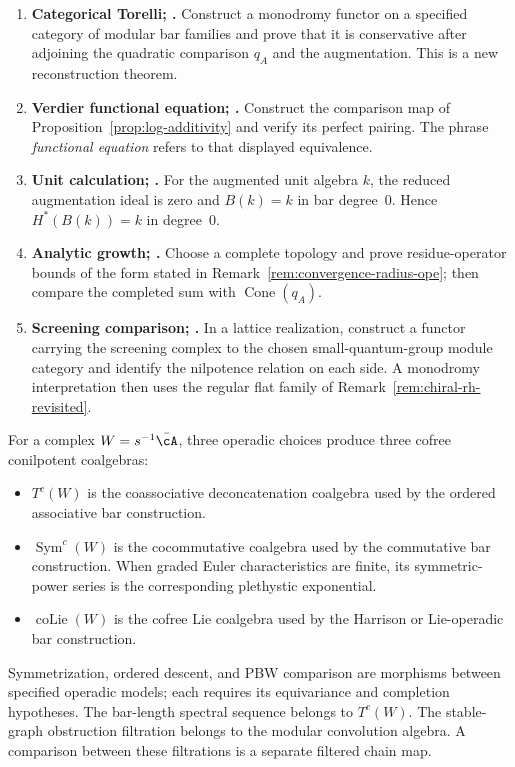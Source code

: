 \begin{enumerate}[label=(\arabic*)]
\item \textbf{Categorical Torelli; \ClaimStatusConjectured.}
Construct a monodromy functor on a specified category of modular bar
families and prove that it is conservative after adjoining the
quadratic comparison $q_A$ and the augmentation.  This is a new
reconstruction theorem.

\item \textbf{Verdier functional equation;
\ClaimStatusConditional.} Construct the comparison map of
Proposition~\ref{prop:log-additivity} and verify its perfect pairing.
The phrase \emph{functional equation} refers to that displayed
equivalence.

\item \textbf{Unit calculation; \ClaimStatusProvedHere.}  For the
augmented unit algebra $k$, the reduced augmentation ideal is zero and
$B(k)=k$ in bar degree~$0$.  Hence
$H^*(B(k))=k$ in degree~$0$.

\item \textbf{Analytic growth; \ClaimStatusHeuristic.}  Choose a
complete topology and prove residue-operator bounds of the form stated
in Remark~\ref{rem:convergence-radius-ope}; then compare the completed
sum with $\operatorname{Cone}(q_A)$.

\item \textbf{Screening comparison; \ClaimStatusConjectured.}  In a
lattice realization, construct a functor carrying the screening
complex to the chosen small-quantum-group module category and identify
the nilpotence relation on each side.  A monodromy interpretation then
uses the regular flat family of
Remark~\ref{rem:chiral-rh-revisited}.
\end{enumerate}

\begin{remark}
\label{rem:quantized-symmetric-power}
For a complex $W=s^{-1}\bar\cA$, three operadic choices produce three
cofree conilpotent coalgebras:
\begin{itemize}
\item $T^c(W)$ is the coassociative deconcatenation coalgebra used by
the ordered associative bar construction.
\item $\operatorname{Sym}^c(W)$ is the cocommutative coalgebra used by
the commutative bar construction.  When graded Euler characteristics
are finite, its symmetric-power series is the corresponding
plethystic exponential.
\item $\operatorname{coLie}(W)$ is the cofree Lie coalgebra used by
the Harrison or Lie-operadic bar construction.
\end{itemize}
Symmetrization, ordered descent, and PBW comparison are morphisms
between specified operadic models; each requires its equivariance and
completion hypotheses.  The bar-length spectral sequence belongs to
$T^c(W)$.  The stable-graph obstruction filtration belongs to the
modular convolution algebra.  A comparison between these filtrations
is a separate filtered chain map.
\end{remark}

